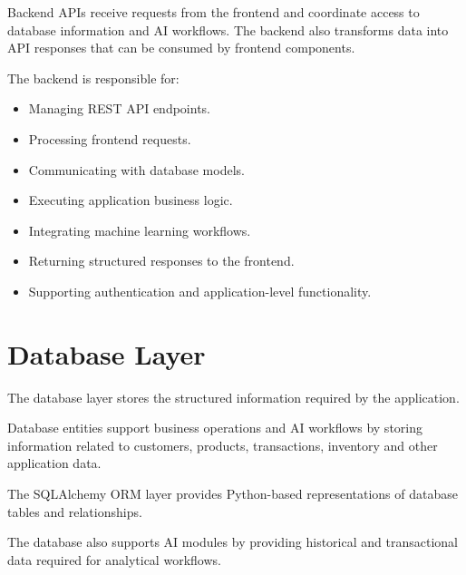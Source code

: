 \documentclass[12pt,a4paper]{report}
\begin{document}
Backend APIs receive requests from the frontend and coordinate access to
database information and AI workflows. The backend also transforms data
into API responses that can be consumed by frontend components.

The backend is responsible for:

\begin{itemize}[leftmargin=1.2cm]

\item Managing REST API endpoints.

\item Processing frontend requests.

\item Communicating with database models.

\item Executing application business logic.

\item Integrating machine learning workflows.

\item Returning structured responses to the frontend.

\item Supporting authentication and application-level functionality.

\end{itemize}



\section{Database Layer}

The database layer stores the structured information required by the
application.

Database entities support business operations and AI workflows by storing
information related to customers, products, transactions, inventory and
other application data.

The SQLAlchemy ORM layer provides Python-based representations of
database tables and relationships.

The database also supports AI modules by providing historical and
transactional data required for analytical workflows.


\end{document}
